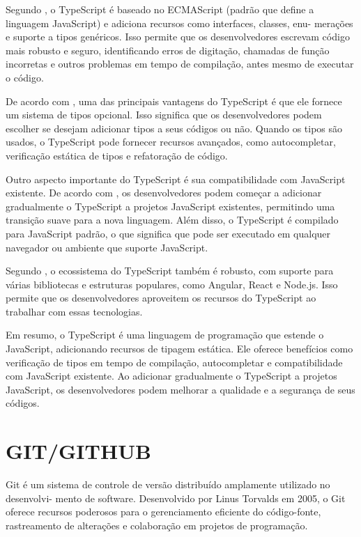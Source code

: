 Segundo \cite{Farinha2018}, o TypeScript é baseado no ECMAScript
(padrão que define a linguagem JavaScript) e adiciona recursos como interfaces, classes, enu-
merações e suporte a tipos genéricos. Isso permite que os desenvolvedores escrevam código
mais robusto e seguro, identificando erros de digitação, chamadas de função incorretas e outros
problemas em tempo de compilação, antes mesmo de executar o código.

De acordo com \cite{Smith2019}, uma das principais vantagens do TypeScript é que ele
fornece um sistema de tipos opcional. Isso significa que os desenvolvedores podem escolher se
desejam adicionar tipos a seus códigos ou não. Quando os tipos são usados, o TypeScript pode
fornecer recursos avançados, como autocompletar, verificação estática de tipos e refatoração de
código.

Outro aspecto importante do TypeScript é sua compatibilidade com JavaScript existente.
De acordo com \cite{Johnson2020}, os desenvolvedores podem começar a adicionar gradualmente
o TypeScript a projetos JavaScript existentes, permitindo uma transição suave para a nova
linguagem. Além disso, o TypeScript é compilado para JavaScript padrão, o que significa que
pode ser executado em qualquer navegador ou ambiente que suporte JavaScript.

Segundo \cite{Oliveira2017}, o ecossistema do TypeScript também é robusto, com
suporte para várias bibliotecas e estruturas populares, como Angular, React e Node.js. Isso
permite que os desenvolvedores aproveitem os recursos do TypeScript ao trabalhar com essas
tecnologias.

Em resumo, o TypeScript é uma linguagem de programação que estende o JavaScript,
adicionando recursos de tipagem estática. Ele oferece benefícios como verificação de tipos em
tempo de compilação, autocompletar e compatibilidade com JavaScript existente. Ao adicionar
gradualmente o TypeScript a projetos JavaScript, os desenvolvedores podem melhorar a qualidade
e a segurança de seus códigos.


\section{GIT/GITHUB}
Git é um sistema de controle de versão distribuído amplamente utilizado no desenvolvi-
mento de software. Desenvolvido por Linus Torvalds em 2005, o Git oferece recursos poderosos
para o gerenciamento eficiente do código-fonte, rastreamento de alterações e colaboração em
projetos de programação.

